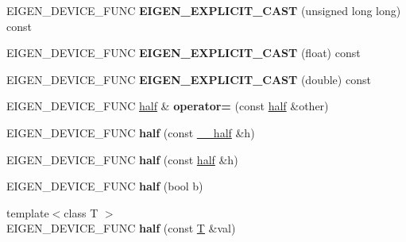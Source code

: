 \begin{DoxyCompactItemize}
E\+I\+G\+E\+N\+\_\+\+D\+E\+V\+I\+C\+E\+\_\+\+F\+U\+NC {\bfseries E\+I\+G\+E\+N\+\_\+\+E\+X\+P\+L\+I\+C\+I\+T\+\_\+\+C\+A\+ST} (unsigned long long) const
\item 
\mbox{\label{struct_eigen_1_1half_a36b0fe8c6af9c353b1c4c9578cd24227}} 
E\+I\+G\+E\+N\+\_\+\+D\+E\+V\+I\+C\+E\+\_\+\+F\+U\+NC {\bfseries E\+I\+G\+E\+N\+\_\+\+E\+X\+P\+L\+I\+C\+I\+T\+\_\+\+C\+A\+ST} (float) const
\item 
\mbox{\label{struct_eigen_1_1half_adec8bfdfe430518626453a17e1d90ca2}} 
E\+I\+G\+E\+N\+\_\+\+D\+E\+V\+I\+C\+E\+\_\+\+F\+U\+NC {\bfseries E\+I\+G\+E\+N\+\_\+\+E\+X\+P\+L\+I\+C\+I\+T\+\_\+\+C\+A\+ST} (double) const
\item 
\mbox{\label{struct_eigen_1_1half_a1bdc641b2ae9ee7cd8289b116a7c96b3}} 
E\+I\+G\+E\+N\+\_\+\+D\+E\+V\+I\+C\+E\+\_\+\+F\+U\+NC \hyperlink{struct_eigen_1_1half}{half} \& {\bfseries operator=} (const \hyperlink{struct_eigen_1_1half}{half} \&other)
\item 
\mbox{\label{struct_eigen_1_1half_aec0a5f49faeb9badec14e7f8d885733e}} 
E\+I\+G\+E\+N\+\_\+\+D\+E\+V\+I\+C\+E\+\_\+\+F\+U\+NC {\bfseries half} (const \hyperlink{struct_eigen_1_1half__impl_1_1____half}{\+\_\+\+\_\+half} \&h)
\item 
\mbox{\label{struct_eigen_1_1half_a164c583ebcb7826def575cc105c8c284}} 
E\+I\+G\+E\+N\+\_\+\+D\+E\+V\+I\+C\+E\+\_\+\+F\+U\+NC {\bfseries half} (const \hyperlink{struct_eigen_1_1half}{half} \&h)
\item 
\mbox{\label{struct_eigen_1_1half_a6d3741a7999bec720162c4fc8cdf17b8}} 
E\+I\+G\+E\+N\+\_\+\+D\+E\+V\+I\+C\+E\+\_\+\+F\+U\+NC {\bfseries half} (bool b)
\item 
\mbox{\label{struct_eigen_1_1half_ad9417b03b1647ba1a11fa878d6b6f6da}} 
{\footnotesize template$<$class T $>$ }\\E\+I\+G\+E\+N\+\_\+\+D\+E\+V\+I\+C\+E\+\_\+\+F\+U\+NC {\bfseries half} (const \hyperlink{group___sparse_core___module}{T} \&val)
\item 
\mbox{\label{struct_eigen_1_1half_a9d2a0ff89919f07454e80c677bd3e4ae}} 

\end{DoxyCompactItemize}
